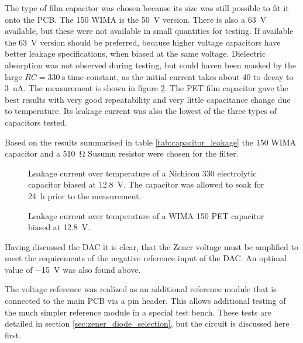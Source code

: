 The type of film capacitor was chosen because its size was still possible to fit it onto the PCB. The \qty{150}{\uF} WIMA  is the \qty{50}{\V} version. There is also a \qty{63}{\V} available, but these were not available in small quantities for testing. If available the \qty{63}{\V} version should be preferred, because higher voltage capacitors have better leakage specifications, when biased at the same voltage. Dielectric absorption was not observed during testing, but could haven been masked by the large $RC = \qty{330}{\s}$ time constant, as the initial current takes about \qty{40}{\min} to decay to \qty{3}{\nA}. The measurement is shown in figure \ref{fig:leakage_current_mks4}. The PET film capacitor gave the best results with very good repeatability and very little capacitance change due to temperature. Its leakage current was also the lowest of the three types of capacitors tested.

Based on the results summarised in table \ref{tab:capacitor_leakage} the \qty{150}{\uF} WIMA  capacitor and a \qty{510}{\ohm} Susumu  resistor were chosen for the filter.

\begin{figure}[ht]
    \centering
    
    \caption{Leakage current over temperature of a Nichicon  \qty{330}{\uF} electrolytic capacitor biased at \qty{12.8}{\V}. The capacitor was allowed to soak for \qty{24}{\hour} prior to the measurement.}
    \label{fig:leakage_current_ukl}
\end{figure}
\clearpage

\begin{figure}[ht]
    \centering
    
    \caption{Leakage current over temperature of a WIMA  \qty{150}{\uF} PET capacitor biased at \qty{12.8}{\V}.}
    \label{fig:leakage_current_mks4}
\end{figure}
\clearpage

Having discussed the DAC it is clear, that the Zener voltage must be amplified to meet the requirements of the negative reference input of the DAC. An optimal value of \qty{-15}{\V} was also found above.

The voltage reference was realized as an additional reference module that is connected to the main PCB via a pin header. This allows additional testing of the much simpler reference module in a special test bench. These tests are detailed in section \ref{sec:zener_diode_selection}, but the circuit is discussed here first.

